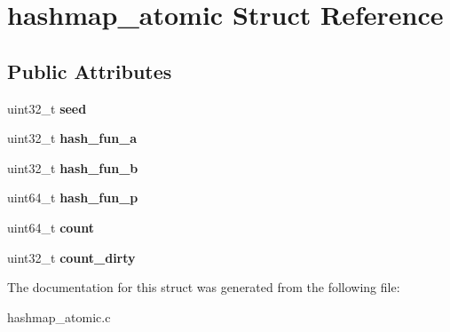 \hypertarget{structhashmap__atomic}{}\section{hashmap\+\_\+atomic Struct Reference}
\label{structhashmap__atomic}
\subsection*{Public Attributes}
\begin{DoxyCompactItemize}
\item 
uint32\+\_\+t {\bfseries seed}\hypertarget{structhashmap__atomic_a83e3b765935189ca4a6bf0c0e33c8d09}{}\label{structhashmap__atomic_a83e3b765935189ca4a6bf0c0e33c8d09}

\item 
uint32\+\_\+t {\bfseries hash\+\_\+fun\+\_\+a}\hypertarget{structhashmap__atomic_a95d74f846934cb275183a28df0ff14a8}{}\label{structhashmap__atomic_a95d74f846934cb275183a28df0ff14a8}

\item 
uint32\+\_\+t {\bfseries hash\+\_\+fun\+\_\+b}\hypertarget{structhashmap__atomic_aa2476a3fa7d4d13c4b4d83d80ee1bb4c}{}\label{structhashmap__atomic_aa2476a3fa7d4d13c4b4d83d80ee1bb4c}

\item 
uint64\+\_\+t {\bfseries hash\+\_\+fun\+\_\+p}\hypertarget{structhashmap__atomic_ae9459faea29e49b192e2c2d8e59d235d}{}\label{structhashmap__atomic_ae9459faea29e49b192e2c2d8e59d235d}

\item 
uint64\+\_\+t {\bfseries count}\hypertarget{structhashmap__atomic_adb45831ae8cc7d5335b048ccc0ba2009}{}\label{structhashmap__atomic_adb45831ae8cc7d5335b048ccc0ba2009}

\item 
uint32\+\_\+t {\bfseries count\+\_\+dirty}\hypertarget{structhashmap__atomic_a4e9b4e9443278085568203af85278e6f}{}\label{structhashmap__atomic_a4e9b4e9443278085568203af85278e6f}

\end{DoxyCompactItemize}


The documentation for this struct was generated from the following file\+:\begin{DoxyCompactItemize}
\item 
hashmap\+\_\+atomic.\+c\end{DoxyCompactItemize}

